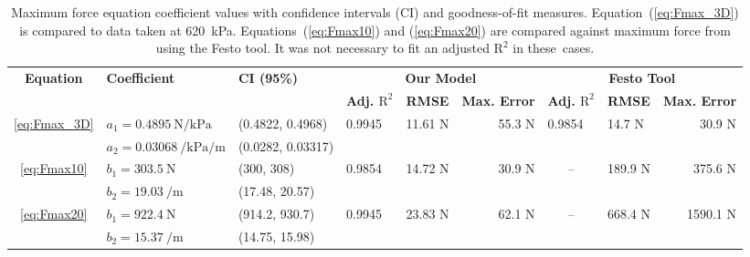 \begin{table}[H]
\caption{Maximum force equation coefficient values with confidence intervals (CI) and goodness-of-fit measures. Equation~(\ref{eq:Fmax_3D}) is compared to data taken at \qty{620}{\kPa}. Equations~(\ref{eq:Fmax10}) and (\ref{eq:Fmax20}) are compared against maximum force from using the Festo tool. It was not necessary to fit an adjusted $\text{R}^2$ in \mbox{these cases.}}
\label{tab:Fmax}
\tiny
\begin{adjustwidth}{0cm}{0cm}
\begin{tabularx}{\textwidth}{cllllrclr}
\toprule
\multirow{2}{*}{\textbf{Equation}} &
  \multirow{2.1}{*}{\textbf{Coefficient}} &
  \multirow{2.2}{*}{\textbf{CI (95\%)}} &
  \multicolumn{3}{c}{\textbf{Our Model}} &
  \multicolumn{3}{c}{\textbf{Festo Tool}} \\  
 &
   &
   &
  \multicolumn{1}{l}{\textbf{Adj. $\text{R}^2$}} &
  \multicolumn{1}{l}{\textbf{RMSE}} &
  \textbf{Max. Error} &
  \multicolumn{1}{l}{\textbf{Adj. $\text{R}^2$}} &
  \multicolumn{1}{l}{\textbf{RMSE}} &
  \textbf{Max. Error} \\ \midrule 
\multirow{2}{*}{\eqref{eq:Fmax_3D}} &
  $a_1 =   \qty{0.4895}{\N\per\kPa}$ &
  (0.4822, 0.4968) &
  \multicolumn{1}{l}{\multirow{2}{*}{0.9945}} &
  \multicolumn{1}{l}{\multirow{2}{*}{11.61 N}} &
  \multirow{2}{*}{55.3 N} &
  \multicolumn{1}{l}{\multirow{2}{*}{0.9854}} &
  \multicolumn{1}{l}{\multirow{2}{*}{14.7 N}} &
  \multirow{2}{*}{30.9 N} \\ 
 &
  $a_2 =   \qty{0.03068}{\per\kPa\per\m}$ &
  (0.0282, 0.03317) &
  \multicolumn{1}{l}{} &
  \multicolumn{1}{l}{} &
   &
  \multicolumn{1}{l}{} &
  \multicolumn{1}{l}{} &
   \\ \midrule
\multirow{2}{*}{\eqref{eq:Fmax10}} &
  $b_1   =\qty{303.5}{\N}$ &
  (300, 308) &
  \multicolumn{1}{l}{\multirow{2}{*}{0.9854}} &
  \multicolumn{1}{l}{\multirow{2}{*}{14.72 N}} &
  \multirow{2}{*}{30.9 N} &
  \multicolumn{1}{c}{\multirow{2}{*}{--}} &
  \multicolumn{1}{l}{\multirow{2}{*}{189.9 N}} &
  \multirow{2}{*}{375.6 N} \\ 
 &
  $b_2 =   \qty{19.03}{\per\m}$ &
  (17.48, 20.57) &
  \multicolumn{1}{l}{} &
  \multicolumn{1}{l}{} &
   &
  \multicolumn{1}{l}{} &
  \multicolumn{1}{l}{} &
   \\ \midrule
\multirow{2}{*}{\eqref{eq:Fmax20}} &
  $b_1 =   \qty{922.4}{\N}$ &
  (914.2, 930.7) &
  \multicolumn{1}{l}{\multirow{2}{*}{0.9945}} &
  \multicolumn{1}{l}{\multirow{2}{*}{23.83 N}} &
  \multirow{2}{*}{62.1 N} &
  \multicolumn{1}{c}{\multirow{2}{*}{--}} &
  \multicolumn{1}{l}{\multirow{2}{*}{668.4 N}} &
  \multirow{2}{*}{1590.1 N} \\ 
 &
  $b_2=\qty{15.37}{\per\m}$ &
  (14.75, 15.98) &
  \multicolumn{1}{l}{} &
  \multicolumn{1}{l}{} &
   &
  \multicolumn{1}{l}{} &
  \multicolumn{1}{l}{} &
   \\ \bottomrule
\end{tabularx}
\end{adjustwidth}
\end{table}



